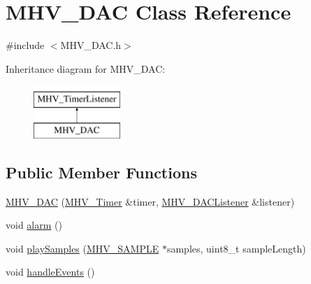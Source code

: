 \hypertarget{class_m_h_v___d_a_c}{\section{M\-H\-V\-\_\-\-D\-A\-C Class Reference}
\label{class_m_h_v___d_a_c}
}


{\ttfamily \#include $<$M\-H\-V\-\_\-\-D\-A\-C.\-h$>$}

Inheritance diagram for M\-H\-V\-\_\-\-D\-A\-C\-:\begin{figure}[H]
\begin{center}
\leavevmode
\includegraphics[height=2.000000cm]{class_m_h_v___d_a_c}
\end{center}
\end{figure}
\subsection*{Public Member Functions}
\begin{DoxyCompactItemize}
\item 
\hyperlink{class_m_h_v___d_a_c_a3963ecd6559f115724688465c8b7faee}{M\-H\-V\-\_\-\-D\-A\-C} (\hyperlink{class_m_h_v___timer}{M\-H\-V\-\_\-\-Timer} \&timer, \hyperlink{class_m_h_v___d_a_c_listener}{M\-H\-V\-\_\-\-D\-A\-C\-Listener} \&listener)
\item 
void \hyperlink{class_m_h_v___d_a_c_a1973fe7e81f91152cf0ecc78328121be}{alarm} ()
\item 
void \hyperlink{class_m_h_v___d_a_c_af8820057fa7f9c33776da4f1272d79fb}{play\-Samples} (\hyperlink{_m_h_v___d_a_c_8h_a5ed12db0bcd6a3870733daecfb30e640}{M\-H\-V\-\_\-\-S\-A\-M\-P\-L\-E} $\ast$samples, uint8\-\_\-t sample\-Length)
\item 
void \hyperlink{class_m_h_v___d_a_c_aeebe7f40fafc2d592426e148ba87704d}{handle\-Events} ()
\end{DoxyCompactItemize}

